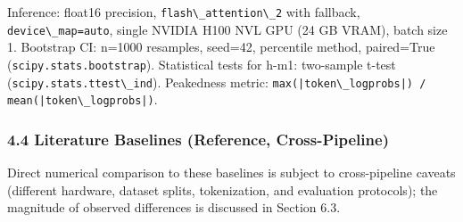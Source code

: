 Inference: float16 precision, \texttt{flash\textbackslash \_attention\textbackslash \_2} with fallback, \texttt{device\textbackslash \_map=auto}, single NVIDIA H100 NVL GPU (24 GB VRAM), batch size 1. Bootstrap CI: n=1000 resamples, seed=42, percentile method, paired=True (\texttt{scipy.stats.bootstrap}). Statistical tests for h-m1: two-sample t-test (\texttt{scipy.stats.ttest\textbackslash \_ind}). Peakedness metric: \texttt{max(|token\textbackslash \_logprobs|) / mean(|token\textbackslash \_logprobs|)}.

\subsubsection{4.4 Literature Baselines (Reference, Cross-Pipeline)}

\begin{table}[htbp]
\centering
{}
\end{table}

Direct numerical comparison to these baselines is subject to cross-pipeline caveats (different hardware, dataset splits, tokenization, and evaluation protocols); the magnitude of observed differences is discussed in Section 6.3.

